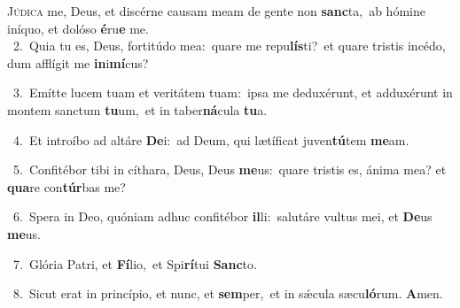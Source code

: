 \lettrine{\initial\textcolor{\initialcolor}{J}}{údica} me, Deus, et discérne causam meam de gente non \textbf{sanc}\-ta,~\star ab hómine iníquo, et dolóso \textbf{é}\-ru\textbf{e} me.\\
{\numbfont\textcolor{\numbcolor}{~2.}}~Quia tu es, Deus, fortitúdo mea:~\dagger quare me repu\-\textbf{lís}\-ti?~\star et quare tristis incédo, dum afflígit me \textbf{in}\-i\-\textbf{mí}\-cus?\par
{\numbfont\textcolor{\numbcolor}{~3.}}~Emítte lucem tuam et veritátem tuam:~\dagger ipsa me deduxérunt, et adduxérunt in montem sanctum \textbf{tu}\-um,~\star et in taber\-\textbf{ná}\-cula \textbf{tu}\-a.\par
{\numbfont\textcolor{\numbcolor}{~4.}}~Et introíbo ad altáre \textbf{De}\-i:~\star ad Deum, qui lætíficat juven\-\textbf{tú}\-tem \textbf{me}\-am.\par
{\numbfont\textcolor{\numbcolor}{~5.}}~Confitébor tibi in cíthara, Deus, Deus \textbf{me}\-us:~\star quare tristis es, ánima mea? et \textbf{qua}\-re con\-\textbf{túr}\-bas me?\par
{\numbfont\textcolor{\numbcolor}{~6.}}~Spera in Deo, quóniam adhuc confitébor \textbf{il}\-li:~\star salutáre vultus mei, et \textbf{De}\-us \textbf{me}\-us.\par
{\numbfont\textcolor{\numbcolor}{~7.}}~Glória Patri, et \textbf{Fí}\-lio,~\star et Spi\-\textbf{rí}\-tui \textbf{Sanc}\-to.\par
{\numbfont\textcolor{\numbcolor}{~8.}}~Sicut erat in princípio, et nunc, et \textbf{sem}\-per,~\star et in sǽcula sæcu\-\textbf{ló}\-rum. \textbf{A}\-men.\par
